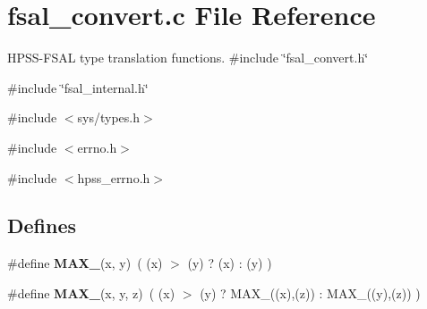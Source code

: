 \section{fsal\_\-convert.c File Reference}
\label{fsal__convert_8c}


HPSS-\/FSAL type translation functions.  
{\ttfamily \#include \char`\"{}fsal\_\-convert.h\char`\"{}}\par
{\ttfamily \#include \char`\"{}fsal\_\-internal.h\char`\"{}}\par
{\ttfamily \#include $<$sys/types.h$>$}\par
{\ttfamily \#include $<$errno.h$>$}\par
{\ttfamily \#include $<$hpss\_\-errno.h$>$}\par
\subsection*{Defines}
\begin{DoxyCompactItemize}
\item 
\#define {\bfseries MAX\_}(x, y)~( (x) $>$ (y) ? (x) : (y) )\label{fsal__convert_8c_a29bc465820d0719bc24cb339e75806d0}

\item 
\#define {\bfseries MAX\_}(x, y, z)~( (x) $>$ (y) ? MAX\_((x),(z)) : MAX\_((y),(z)) )\label{fsal__convert_8c_ae28623bae2af7d233caa8038601aa853}

\end{DoxyCompactItemize}
